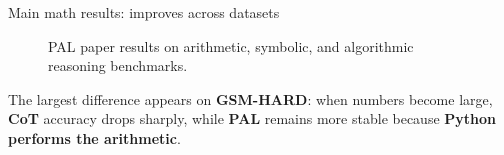 \begin{frame}{Main math results: \PAL{} improves across datasets}
\begin{figure}
\caption{PAL paper results on arithmetic, symbolic, and algorithmic reasoning benchmarks.}
\end{figure}
The largest difference appears on \textbf{GSM-HARD}: 
when numbers become large, 
\textbf{CoT} accuracy drops sharply, 
while \textbf{PAL} remains more stable because \textbf{Python performs the arithmetic}.
\end{frame}
